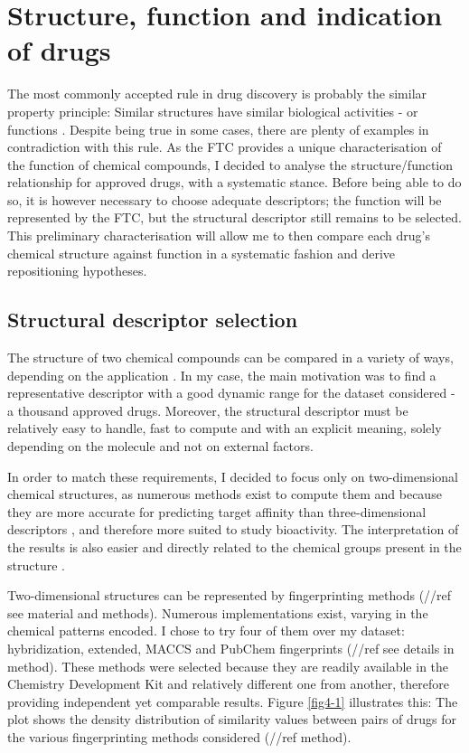 \section{Structure, function and indication of drugs}
The most commonly accepted rule in drug discovery is probably the similar property principle: Similar structures have similar biological activities - or functions \citep{martin2002structurally} \citep{kubinyi1998similarity} \citep{johnson1990concepts}. Despite being true in some cases, there are plenty of examples in contradiction with this rule. As the FTC provides a unique characterisation of the function of chemical compounds, I decided to analyse the structure/function relationship for approved drugs, with a systematic stance. Before being able to do so, it is however necessary to choose adequate descriptors; the function will be represented by the FTC, but the structural descriptor still remains to be selected. This preliminary characterisation will allow me to then compare each drug’s chemical structure against function in a systematic fashion and derive repositioning hypotheses.

\subsection{Structural descriptor selection}
The structure of two chemical compounds can be compared in a variety of ways, depending on the application \citep{johnson1990concepts}. In my case, the main motivation was to find a representative descriptor with a good dynamic range for the dataset considered - a thousand approved drugs. Moreover, the structural descriptor must be relatively easy to handle, fast to compute and with an explicit meaning, solely depending on the molecule and not on external factors.

In order to match these requirements, I decided to focus only on two-dimensional chemical structures, as numerous methods exist to compute them and because they are more accurate for predicting target affinity than three-dimensional descriptors \citep{nettles2006bridging}, and therefore more suited to study bioactivity. The interpretation of the results is also easier and directly related to the chemical groups present in the structure \citep{todeschini2009molecular}.

Two-dimensional structures can be represented by fingerprinting methods (//ref see material and methods). Numerous implementations exist, varying in the chemical patterns encoded. I chose to try four of them over my dataset: hybridization, extended, MACCS and PubChem fingerprints (//ref see details in method). These methods were selected because they are readily available in the Chemistry Development Kit \citep{steinbeck2003chemistry} and relatively different one from another, therefore providing independent yet comparable results. Figure \ref{fig4-1} illustrates this: The plot shows the density distribution of similarity values between pairs of drugs for the various fingerprinting methods considered (//ref method).

